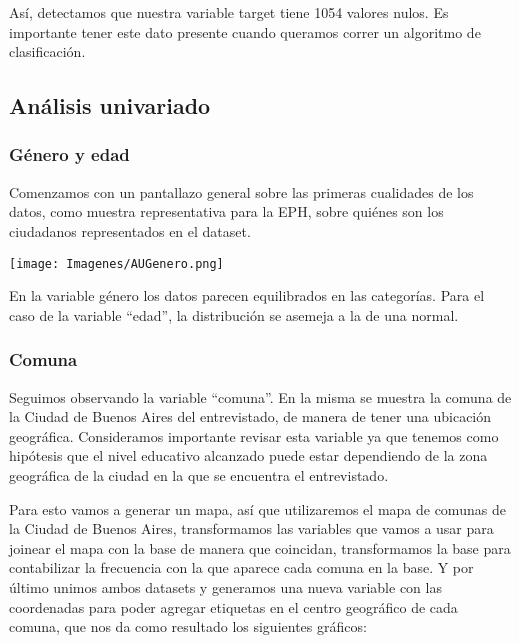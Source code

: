\documentclass[a4paper]{article}
\begin{document}
    Así, detectamos que nuestra variable target tiene 1054 valores nulos. Es importante tener este dato presente cuando queramos correr un algoritmo de clasificación.

    \subsection{Análisis univariado}
 
        \subsubsection{Género y edad}
           
            Comenzamos con un pantallazo general sobre las primeras cualidades de los datos, como muestra representativa para la EPH, sobre quiénes son los ciudadanos representados en el dataset.
           
            \begin{center}
                \texttt{[image: Imagenes/AUGenero.png]}    
            \end{center}
           
 
            En la variable género los datos parecen equilibrados en las categorías. Para el caso de la variable ``edad'', la distribución se asemeja a la de una normal.
           
            \subsubsection{Comuna}
           
            Seguimos observando la variable ``comuna''. En la misma se muestra la comuna de la Ciudad de Buenos Aires del entrevistado, de manera de tener una ubicación geográfica. Consideramos importante revisar esta variable ya que tenemos como hipótesis que el nivel educativo alcanzado puede estar dependiendo de la zona geográfica de la ciudad en la que se encuentra el entrevistado.
           
            Para esto vamos a generar un mapa, así que utilizaremos el mapa de comunas de la Ciudad de Buenos Aires, transformamos las variables que vamos a usar para joinear el mapa con la base de manera que coincidan, transformamos la base para contabilizar la frecuencia con la que aparece cada comuna en la base. Y por último unimos ambos datasets y generamos una nueva variable con las coordenadas para poder agregar etiquetas en el centro geográfico de cada comuna, que nos da como resultado los siguientes gráficos:
           
\end{document}
